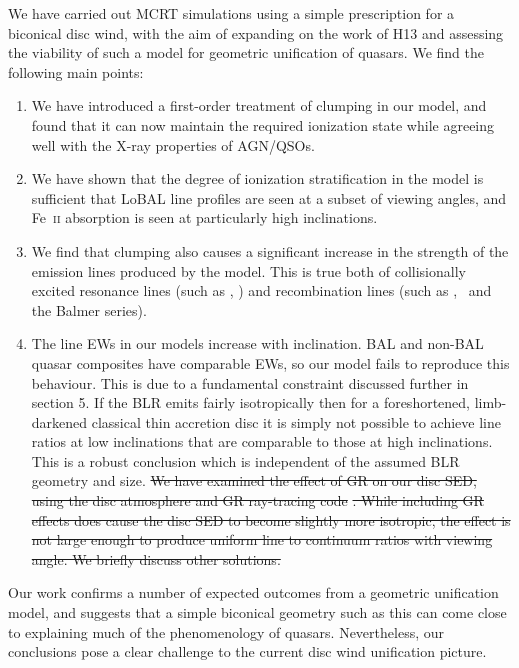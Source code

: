 \documentclass[useAMS,usenatbib]{mn2e_x}
\providecommand{\DIFdel}[1]{{\protect\color{red}\sout{#1}}}                      %
\providecommand{\DIFdelbegin}{} %
\providecommand{\DIFdelend}{} %
\begin{document}
We have carried out MCRT simulations using a simple
prescription for a biconical disc wind, with
the aim of expanding on the work of H13 and assessing 
the viability of such a model for geometric unification of quasars.
We find the following main points:

\begin{enumerate}
\item We have introduced a first-order treatment 
of clumping in our model, and found that it can now maintain
the required ionization state while agreeing well with the X-ray
properties of AGN/QSOs.
\smallskip
\item We have shown that the degree of ionization stratification
in the model is sufficient that LoBAL line profiles
are seen at a subset of viewing angles, and Fe~\textsc{ii}
absorption is seen at particularly high inclinations.
\smallskip
\item We find that clumping also causes a significant 
increase in the strength of the  emission
lines produced by the model. This is true both
of collisionally excited resonance lines (such as \civ, \nv)
and recombination lines (such as \la, \ha\ and the Balmer series).
\smallskip
\item The line EWs in our models increase with inclination.
BAL and non-BAL quasar composites have comparable EWs, so our model
fails to reproduce this behaviour.
This is due to a fundamental constraint discussed further in section 5. If the BLR
emits fairly isotropically then for a foreshortened, limb-darkened classical thin accretion disc
it is simply not possible to achieve line ratios at low inclinations that are comparable to
those at high inclinations. This is a robust conclusion which 
is independent of the assumed BLR geometry and size.
\DIFdelbegin %
\DIFdel{We have examined the effect of GR on our disc SED, using the disc atmosphere
and GR ray-tracing code }%
\DIFdel{. While including GR effects
does cause the disc SED to become slightly more isotropic,
the effect is not large enough to produce uniform line to continuum ratios
with viewing angle. We briefly discuss other solutions.
}\DIFdelend %
\end{enumerate}
Our work confirms a number of expected outcomes from a geometric unification 
model, and suggests that a simple biconical geometry such as this can come close to 
explaining much of the  phenomenology of quasars. Nevertheless, our conclusions pose 
a clear challenge to the current disc wind unification picture.
\end{document}
